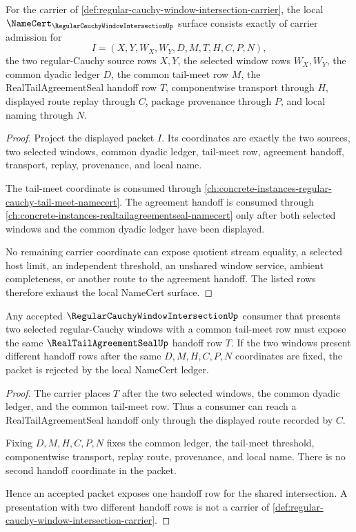 \begin{theorem}
\label{thm:regular-cauchy-window-intersection-namecert-obligations}
For the carrier of \autoref{def:regular-cauchy-window-intersection-carrier}, the local $\NameCert_{\RegularCauchyWindowIntersectionUp}$ surface consists exactly of carrier admission for
$$
I=(X,Y,W_X,W_Y,D,M,T,H,C,P,N),
$$
the two regular-Cauchy source rows $X,Y$, the selected window rows $W_X,W_Y$, the common dyadic ledger $D$, the common tail-meet row $M$, the RealTailAgreementSeal handoff row $T$, componentwise transport through $H$, displayed route replay through $C$, package provenance through $P$, and local naming through $N$.
\end{theorem}
\begin{proof}
Project the displayed packet $I$. Its coordinates are exactly the two sources, two selected windows, common dyadic ledger, tail-meet row, agreement handoff, transport, replay, provenance, and local name.

The tail-meet coordinate is consumed through \autoref{ch:concrete-instances-regular-cauchy-tail-meet-namecert}. The agreement handoff is consumed through \autoref{ch:concrete-instances-realtailagreementseal-namecert} only after both selected windows and the common dyadic ledger have been displayed.

No remaining carrier coordinate can expose quotient stream equality, a selected host limit, an independent threshold, an unshared window service, ambient completeness, or another route to the agreement handoff. The listed rows therefore exhaust the local NameCert surface.
\end{proof}

\begin{theorem}
\label{thm:regular-cauchy-window-intersection-falsifiable-boundary}
Any accepted $\RegularCauchyWindowIntersectionUp$ consumer that presents two selected regular-Cauchy windows with a common tail-meet row must expose the same $\RealTailAgreementSealUp$ handoff row $T$. If the two windows present different handoff rows after the same $D,M,H,C,P,N$ coordinates are fixed, the packet is rejected by the local NameCert ledger.
\end{theorem}
\begin{proof}
The carrier places $T$ after the two selected windows, the common dyadic ledger, and the common tail-meet row. Thus a consumer can reach a RealTailAgreementSeal handoff only through the displayed route recorded by $C$.

Fixing $D,M,H,C,P,N$ fixes the common ledger, the tail-meet threshold, componentwise transport, replay route, provenance, and local name. There is no second handoff coordinate in the packet.

Hence an accepted packet exposes one handoff row for the shared intersection. A presentation with two different handoff rows is not a carrier of \autoref{def:regular-cauchy-window-intersection-carrier}.
\end{proof}

